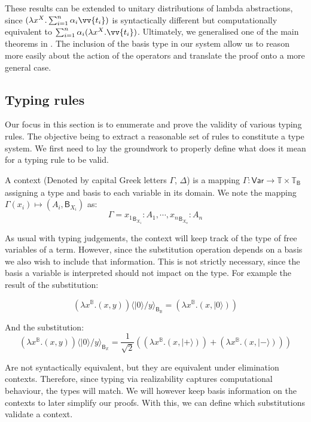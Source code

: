 \documentclass[runningheads,orivec,envcountsame,envcountsect]{llncs}
\newcommand\ket[1]{\ensuremath{|#1\rangle}}
\newcommand\Var{\ensuremath{\mathsf{Var}}}
\newcommand\ansubst[2]{\ensuremath{\langle #1 \rangle_{#2}}}
\def\Pair#1#2{(#1,#2)} %
\def\Lam#1#2#3{\lambda#1^{#2}{.}#3} %
\def\Type{\mathbb{T}}
\def\BasisType{\Type_{\basis{}}}
\newcommand\B{\mathbb B}
\newcommand\XB{\mathbb X}
\newcommand\basis[1]{\ensuremath{\mathsf{B}_{#1}}}
\begin{document}
These results can be extended to unitary distributions of lambda abstractions, since $(\Lam{x}{X}{\sum_{i=1}^{n}\alpha_i \vv{t_i}})$ is syntactically different but computationally equivalent to $\sum_{i=1}^{n}\alpha_i (\Lam{x}{X}{\vv{t_i}})$. Ultimately, we generalised one of the main theorems in \cite{DiazcaroGuillermoMiquelValironLICS19}. The inclusion of the basis type in our system allow us to reason more easily about the action of the operators and translate the proof onto a more general case. 


\subsection{Typing rules}    
Our focus in this section is to enumerate and prove the validity of various typing rules. The objective being to extract a reasonable set of rules to constitute a type system. We first need to lay the groundwork to properly define what does it mean for a typing rule to be valid.

\begin{definition}
    A context (Denoted by capital Greek letters $\Gamma$, $\Delta$) is a mapping $\Gamma:\Var\to\Type\times\BasisType$ assigning a type and basis to each variable in its domain. We note the mapping $\Gamma(x_i)\mapsto(A_i, \basis{X_i})$ as:
    \[
    \Gamma = {x_1}_{\basis{X_1}}:A_1,\dotsb, {x_n}_{\basis{X_n}}:A_n
    \]
\end{definition}

As usual with typing judgements, the context will keep track of the type of free variables of a term. However, since the substitution operation depends on a basis we also wish to include that information. This is not strictly necessary, since the basis a variable is interpreted should not impact on the type. For example the result of the substitution:

\[
(\Lam{x}{\B}{\Pair{x}{y}})\ansubst{\ket{0}/y}{\basis{\B}} = (\Lam{x}{\B}{\Pair{x}{\ket{0}}})
\]

And the substitution:
\[
(\Lam{x}{\B}{(x, y)})\ansubst{\ket{0}/y}{\basis{\XB}} = \frac{1}{\sqrt{2}} ((\Lam{x}{\B}{\Pair{x}{\ket{+}}}) + (\Lam{x}{\B}{\Pair{x}{\ket{-}}}))
\]

Are not syntactically equivalent, but they are equivalent under elimination contexts. Therefore, since typing via realizability captures computational behaviour, the types will match. We will however keep basis information on the contexts to later simplify our proofs. With this, we can define which substitutions validate a context.
\end{document}
